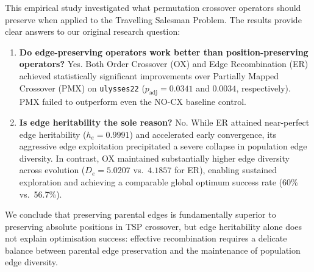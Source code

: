 \documentclass[10pt,a4paper]{article}
\begin{document}
This empirical study investigated what permutation crossover operators should preserve when applied to the Travelling Salesman Problem. The results provide clear answers to our original research question:
\begin{enumerate}
    \item \textbf{Do edge-preserving operators work better than position-preserving operators?} Yes. Both Order Crossover (OX) and Edge Recombination (ER) achieved statistically significant improvements over Partially Mapped Crossover (PMX) on \texttt{ulysses22} ($p_{\text{adj}} = 0.0341$ and $0.0034$, respectively). PMX failed to outperform even the NO-CX baseline control.
    \item \textbf{Is edge heritability the sole reason?} No. While ER attained near-perfect edge heritability ($h_e = 0.9991$) and accelerated early convergence, its aggressive edge exploitation precipitated a severe collapse in population edge diversity. In contrast, OX maintained substantially higher edge diversity across evolution ($D_e = 5.0207$ vs.~$4.1857$ for ER), enabling sustained exploration and achieving a comparable global optimum success rate (60\% vs.~56.7\%).
\end{enumerate}
We conclude that preserving parental edges is fundamentally superior to preserving absolute positions in TSP crossover, but edge heritability alone does not explain optimisation success: effective recombination requires a delicate balance between parental edge preservation and the maintenance of population edge diversity.
\end{document}
